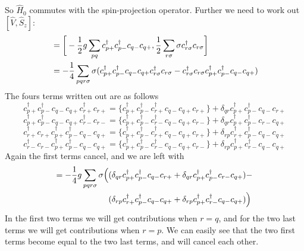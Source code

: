 \documentclass[norsk,a4paper,12pt]{article}
\begin{document}
So $\hat{H}_0$ commutes with the spin-projection operator. Further we need to work out  $[\hat{V},\hat{S}_z]$:
\begin{align}
[\hat{V},\hat{S}_z]&=\bigg[-\frac{1}{2}g\sum_{pq}c_{p+}^{\dagger}c_{p-}^{\dagger}c_{q-}c_{q+},\frac{1}{2}\sum_{r\sigma}\sigma c_{r\sigma}^{\dagger}c_{r\sigma}\bigg]\notag\\
&=-\frac{1}{4}\sum_{pqr\sigma}\sigma(c_{p+}^{\dagger}c_{p-}^{\dagger}c_{q-}c_{q+}c_{r\sigma}^{\dagger}c_{r\sigma}-c_{r\sigma}^{\dagger}c_{r\sigma}c_{p+}^{\dagger}c_{p-}^{\dagger}c_{q-}c_{q+})
\end{align}
The fours terms written out are as follows
\begin{equation}
c_{p+}^{\dagger}c_{p-}^{\dagger}c_{q-}c_{q+}c_{r+}^{\dagger}c_{r+}=\{c_{p+}^{\dagger}c_{p-}^{\dagger}c_{r+}^{\dagger}c_{q-}c_{q+}c_{r+}\}+\delta_{qr}c_{p+}^{\dagger}c_{p-}^{\dagger}c_{q-}c_{r+}
\end{equation}
\begin{equation}
c_{p+}^{\dagger}c_{p-}^{\dagger}c_{q-}c_{q+}c_{r-}^{\dagger}c_{r-}=\{c_{p+}^{\dagger}c_{p-}^{\dagger}c_{r-}^{\dagger}c_{q-}c_{q+}c_{r-}\}+\delta_{qr}c_{p+}^{\dagger}c_{p-}^{\dagger}c_{r-}c_{q+}
\end{equation}
\begin{equation}
c_{r+}^{\dagger}c_{r+}c_{p+}^{\dagger}c_{p-}^{\dagger}c_{q-}c_{q+}=\{c_{p+}^{\dagger}c_{p-}^{\dagger}c_{r+}^{\dagger}c_{q-}c_{q+}c_{r+}\}+\delta_{rp}c_{r+}^{\dagger}c_{p-}^{\dagger}c_{q-}c_{q+}
\end{equation}
\begin{equation}
c_{r-}^{\dagger}c_{r-}c_{p+}^{\dagger}c_{p-}^{\dagger}c_{q-}c_{q+}=\{c_{p+}^{\dagger}c_{p-}^{\dagger}c_{r-}^{\dagger}c_{q-}c_{q+}c_{r-}\}+\delta_{rp}c_{p+}^{\dagger}c_{r-}^{\dagger}c_{q-}c_{q+}
\end{equation}
Again the first terms cancel, and we are left with
\begin{align}
[\hat{V},\hat{S}_z]=-\frac{1}{4}g\sum_{pqr\sigma}\sigma\Big(&(\delta_{qr}c_{p+}^{\dagger}c_{p-}^{\dagger}c_{q-}c_{r+}+\delta_{qr}c_{p+}^{\dagger}c_{p-}^{\dagger}c_{r-}c_{q+})-\notag\\
&(\delta_{rp}c_{r+}^{\dagger}c_{p-}^{\dagger}c_{q-}c_{q+}+\delta_{rp}c_{p+}^{\dagger}c_{r-}^{\dagger}c_{q-}c_{q+})\Big)
\end{align}
In the first two terms we will get contributions when $r=q$, and for the two last terms we will get contributions when $r=p$. We can easily see that the two first terms become equal to the two last terms, and will cancel each other.
\end{document}
